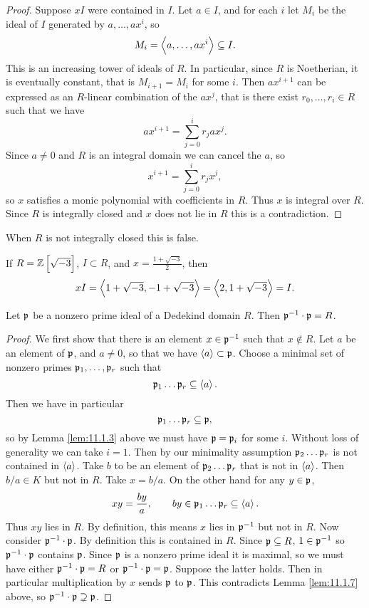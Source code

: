 \begin{proof}
Suppose $ xI $ were contained in $ I $. Let $ a \in I $, and for each $ i $ let $ M_i $ be the ideal of $ I $ generated by $ a, \dots, ax^i $, so
$$ M_i = \left\langle a, \dots, ax^i \right\rangle \subseteq I. $$
This is an increasing tower of ideals of $ R $. In particular, since $ R $ is Noetherian, it is eventually constant, that is $ M_{i + 1} = M_i $ for some $ i $. Then $ ax^{i + 1} $ can be expressed as an $ R $-linear combination of the $ ax^j $, that is there exist $ r_0, \dots, r_i \in R $ such that we have
$$ ax^{i + 1} = \sum_{j = 0}^i r_jax^j. $$
Since $ a \ne 0 $ and $ R $ is an integral domain we can cancel the $ a $, so
$$ x^{i + 1} = \sum_{j = 0}^i r_jx^j, $$
so $ x $ satisfies a monic polynomial with coefficients in $ R $. Thus $ x $ is integral over $ R $. Since $ R $ is integrally closed and $ x $ does not lie in $ R $ this is a contradiction.
\end{proof}

\pagebreak

When $ R $ is not integrally closed this is false.

\begin{example*}
If $ R = \Z\sbr{\sqrt{-3}} $, $ I \subset R $, and $ x = \tfrac{1 + \sqrt{-3}}{2} $, then
$$ xI = \left\langle 1 + \sqrt{-3}, -1 + \sqrt{-3} \right\rangle = \left\langle 2, 1 + \sqrt{-3} \right\rangle = I. $$
\end{example*}

\begin{proposition}
\label{prop:11.1.8}
Let $ \mathfrak{p} $ be a nonzero prime ideal of a Dedekind domain $ R $. Then $ \mathfrak{p}^{-1} \cdot \mathfrak{p} = R $.
\end{proposition}

\begin{proof}
We first show that there is an element $ x \in \mathfrak{p}^{-1} $ such that $ x \notin R $. Let $ a $ be an element of $ \mathfrak{p} $, and $ a \ne 0 $, so that we have $ \left\langle a \right\rangle \subset \mathfrak{p} $. Choose a minimal set of nonzero primes $ \mathfrak{p}_1, \dots, \mathfrak{p}_r $ such that
$$ \mathfrak{p}_1 \dots \mathfrak{p}_r \subseteq \left\langle a \right\rangle. $$
Then we have in particular
$$ \mathfrak{p}_1 \dots \mathfrak{p}_r \subseteq \mathfrak{p}, $$
so by Lemma \ref{lem:11.1.3} above we must have $ \mathfrak{p} = \mathfrak{p}_i $ for some $ i $. Without loss of generality we can take $ i = 1 $. Then by our minimality assumption $ \mathfrak{p}_2 \dots \mathfrak{p}_r $ is not contained in $ \left\langle a \right\rangle $. Take $ b $ to be an element of $ \mathfrak{p}_2 \dots \mathfrak{p}_r $ that is not in $ \left\langle a \right\rangle $. Then $ b / a \in K $ but not in $ R $. Take $ x = b / a $. On the other hand for any $ y \in \mathfrak{p} $,
$$ xy = \dfrac{by}{a}, \qquad by \in \mathfrak{p}_1 \dots \mathfrak{p}_r \subseteq \left\langle a \right\rangle. $$
Thus $ xy $ lies in $ R $. By definition, this means $ x $ lies in $ \mathfrak{p}^{-1} $ but not in $ R $. Now consider $ \mathfrak{p}^{-1} \cdot \mathfrak{p} $. By definition this is contained in $ R $. Since $ \mathfrak{p} \subseteq R $, $ 1 \in \mathfrak{p}^{-1} $ so $ \mathfrak{p}^{-1} \cdot \mathfrak{p} $ contains $ \mathfrak{p} $. Since $ \mathfrak{p} $ is a nonzero prime ideal it is maximal, so we must have either $ \mathfrak{p}^{-1} \cdot \mathfrak{p} = R $ or $ \mathfrak{p}^{-1} \cdot \mathfrak{p} = \mathfrak{p} $. Suppose the latter holds. Then in particular multiplication by $ x $ sends $ \mathfrak{p} $ to $ \mathfrak{p} $. This contradicts Lemma \ref{lem:11.1.7} above, so $ \mathfrak{p}^{-1} \cdot \mathfrak{p} \supsetneq \mathfrak{p} $.
\end{proof}

